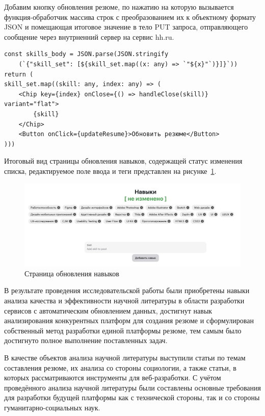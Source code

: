 \documentclass[master, och, pract]{SCWorks}
\begin{document}
Добавим кнопку обновления резюме, по нажатию на которую вызывается функция-обработчик массива строк с преобразованием их к объектному формату JSON и помещающая итоговое значение в тело PUT запроса, отправляющего сообщение через внутрненний сервер на сервис hh.ru.
\begin{verbatim}
const skills_body = JSON.parse(JSON.stringify
    (`{"skill_set": [${skill_set.map((x: any) => `"${x}"`)}]}`))
return (
skill_set.map((skill: any, index: any) => (
    <Chip key={index} onClose={() => handleClose(skill)} variant="flat">
        {skill}
    </Chip>
    <Button onClick={updateResume}>Обновить резюме</Button>
)))
\end{verbatim}

Итоговый вид страницы обновления навыков, содержащей статус изменения списка, редактируемое поле ввода и теги представлен на рисунке~\ref{fig:6}. 
\begin{figure}[!ht]
    \centering
    \includegraphics[width=12cm]{images/image-update-skills.png}
    \caption{\label{fig:6}%
        Страница обновления навыков}
\end{figure}





\newpage
\conclusion
В результате проведения исследовательской работы были приобретены навыки анализа 
качества и эффективности научной литературы в области разработки сервисов 
с автоматическим обновлением данных, достигнут навык анализирования конкурентных 
платформ для создания резюме и сформулирован собственный метод разработки 
единой платформы резюме, тем самым было достигнуто полное выполнение поставленных задач.

В качестве объектов анализа научной литературы выступили статьи по темам составления 
резюме, их анализа со стороны социологии, а также статьи, в которых рассматриваются 
инструменты для веб-разработки. С учётом проведённого анализа научной литературы 
были составлены основные требования для разработки будущей платформы как с технической 
стороны, так и со стороны гуманитарно-социальных наук.
\end{document}
